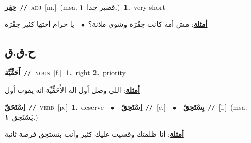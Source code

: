 \documentclass[10pt,a4paper,twoside]{article} %
\begin{document}
\begin{multicols}{2}
{\setlength\topsep{0pt}\textbf{\foreignlanguage{arabic}{حِقِر}}\ {\color{gray}\texttt{//}\color{black}}\ \textsc{adj}\ [m.]\ \color{gray}(msa. \foreignlanguage{arabic}{قصير جدا}~\foreignlanguage{arabic}{\textbf{١.}})\color{black}\ \textbf{1.}~very short\  \begin{flushright}\color{gray}\foreignlanguage{arabic}{\textbf{\underline{\foreignlanguage{arabic}{أمثلة}}}: مش أمه كانت حِقْرَة وشوي ملانة؟\ $\bullet$\ \  يا حرام أختها كثير حِقْرَة}\end{flushright}\color{black}} \vspace{2mm}

\vspace{-3mm}
\subsection*{\color{blue}\foreignlanguage{arabic}{ح.ق.ق}\color{blue}{}} 

{\setlength\topsep{0pt}\textbf{\foreignlanguage{arabic}{أَحَقِّيِّة}}\ {\color{gray}\texttt{//}\color{black}}\ \textsc{noun}\ [f.]\ \textbf{1.}~right  \textbf{2.}~priority\  \begin{flushright}\color{gray}\foreignlanguage{arabic}{\textbf{\underline{\foreignlanguage{arabic}{أمثلة}}}: اللي وصل أول إله الأَحَقِّيِّة انه يفوت أول}\end{flushright}\color{black}} \vspace{2mm}

{\setlength\topsep{0pt}\textbf{\foreignlanguage{arabic}{اِسْتَحَقّ}}\ {\color{gray}\texttt{//}\color{black}}\ \textsc{verb}\ [p.]\ \textbf{1.}~deserve\ \ $\bullet$\ \ \setlength\topsep{0pt}\textbf{\foreignlanguage{arabic}{اِسْتَحِقّ}}\ {\color{gray}\texttt{//}\color{black}}\ [c.]\ \ $\bullet$\ \ \setlength\topsep{0pt}\textbf{\foreignlanguage{arabic}{يِسْتَحِقّ}}\ {\color{gray}\texttt{//}\color{black}}\ [i.]\ \color{gray}(msa. \foreignlanguage{arabic}{يَسْتَحِق}~\foreignlanguage{arabic}{\textbf{١.}})\color{black}\  \begin{flushright}\color{gray}\foreignlanguage{arabic}{\textbf{\underline{\foreignlanguage{arabic}{أمثلة}}}: أنا ظلمتك وقسيت عليك كثير وأنت بتستحِق فرصة ثانية}\end{flushright}\color{black}} \vspace{2mm}


\end{multicols}
\end{document}

